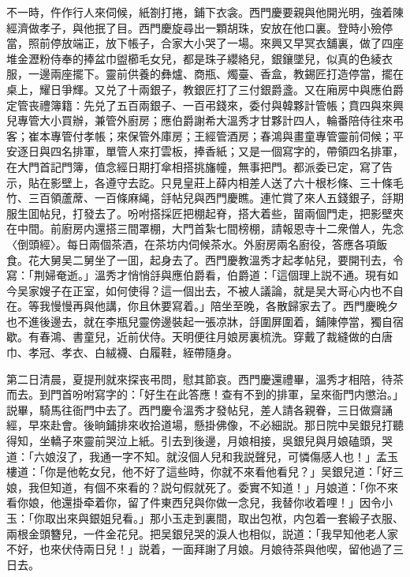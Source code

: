 不一時，仵作行人來伺候，紙劄打捲，鋪下衣衾。西門慶要親與他開光明，強着陳經濟做孝子，與他抿了目。西門慶旋尋出一顆胡珠，安放在他口裏。登時小殮停當，照前停放端正，放下帳子，合家大小哭了一場。來興又早冥衣舖裏，做了四座堆金瀝粉侍奉的捧盆巾盥櫛毛女兒，都是珠子纓絡兒，銀鑲墜兒，似真的色綾衣服，一邊兩座擺下。靈前供養的彝爐、商瓶、燭臺、香盒，教錫匠打造停當，擺在桌上，耀日爭輝。又兑了十兩銀子，教銀匠打了三付銀爵盞。又在廂房中與應伯爵定管丧禮簿籍：先兑了五百兩銀子、一百弔錢來，委付與韓夥計管帳；賁四與來興兒專管大小買辦，兼管外廚房；應伯爵謝希大溫秀才甘夥計四人，輪番陪侍往來弔客；崔本專管付孝帳；來保管外庫房；王經管酒房；春鴻與畫童專管靈前伺候；平安逐日與四名排軍，單管人來打雲板，捧香紙；又是一個寫字的，帶領四名排軍，在大門首記門簿，值念經日期打傘相搭挑旛幢，無事把門。都派委已定，寫了告示，貼在影壁上，各遵守去訖。只見皇莊上薛内相差人送了六十根杉條、三十條毛竹、三百領蘆蓆、一百條麻䋲，㧱帖兒與西門慶瞧。連忙賞了來人五錢銀子，㧱期服生囬帖兒，打發去了。吩咐搭採匠把棚起脊，搭大着些，㽞兩個門走，把影壁夾在中間。前廚房内還搭三間罩棚，大門首紮七間榜棚，請報恩寺十二衆僧人，先念〈倒頭經〉。每日兩個茶酒，在茶坊内伺候茶水。外廚房兩名廚役，答應各項飯食。花大舅吴二舅坐了一囬，起身去了。西門慶教溫秀才起孝帖兒，要開刊去，令寫：「荆婦奄逝。」溫秀才悄悄㧱與應伯爵看，伯爵道：「這個理上説不通。現有如今吴家嫂子在正室，如何使得？這一個出去，不被人議論，就是吴大哥心内也不自在。等我慢慢再與他講，你且休要寫着。」陪坐至晚，各散歸家去了。西門慶晚夕也不進後邊去，就在李瓶兒靈傍邊裝起一張凉牀，㧱圍屏圍着，鋪陳停當，獨自宿歇。有春鴻、書童兒，近前伏侍。天明便往月娘房裏梳洗。穿戴了裁縫做的白唐巾、孝冠、孝衣、白絨襪、白履鞋，絰帶隨身。

第二日清晨，夏提刑就來探丧弔問，慰其節哀。西門慶還禮畢，溫秀才相陪，待茶而去。到門首吩咐寫字的：「好生在此答應！查有不到的排軍，呈來衙門内懲治。」説畢，騎馬往衙門中去了。西門慶令溫秀才發帖兒，差人請各親眷，三日做齋誦經，早來赴會。後晌鋪排來收拾道場，懸掛佛像，不必細説。那日院中吴銀兒打聽得知，坐轎子來靈前哭泣上紙。引去到後邊，月娘相接，吳銀兒與月娘磕頭，哭道：「六娘沒了，我通一字不知。就沒個人兒和我説聲兒，可憐傷感人也！」孟玉樓道：「你是他乾女兒，他不好了這些時，你就不來看他看兒？」吴銀兒道：「好三娘，我但知道，有個不來看的？説句假就死了。委實不知道！」月娘道：「你不來看你娘，他還掛牵着你，留了件東西兒與你做一念兒，我替你收着哩！」因令小玉：「你取出來與銀姐兒看。」那小玉走到裏間，取出包袱，内包着一套緞子衣服、兩根金頭簪兒，一件金花兒。把吴銀兒哭的淚人也相似，説道：「我早知他老人家不好，也來伏侍兩日兒！」説着，一面拜謝了月娘。月娘待茶與他喫，留他過了三日去。

